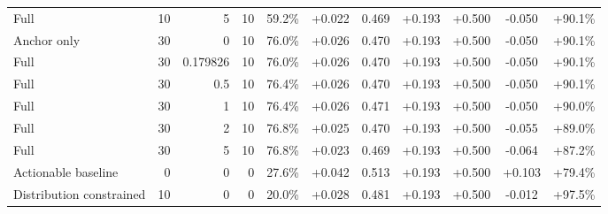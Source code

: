 \begin{table}[htbp]
\begin{tabular}{lrrrccccccc}
Full & 10 & 5 & 10 & 59.2\% & +0.022 & 0.469 & +0.193 & +0.500 & -0.050 & +90.1\% \\
Anchor only & 30 & 0 & 10 & 76.0\% & +0.026 & 0.470 & +0.193 & +0.500 & -0.050 & +90.1\% \\
Full & 30 & 0.179826 & 10 & 76.0\% & +0.026 & 0.470 & +0.193 & +0.500 & -0.050 & +90.1\% \\
Full & 30 & 0.5 & 10 & 76.4\% & +0.026 & 0.470 & +0.193 & +0.500 & -0.050 & +90.1\% \\
Full & 30 & 1 & 10 & 76.4\% & +0.026 & 0.471 & +0.193 & +0.500 & -0.050 & +90.0\% \\
Full & 30 & 2 & 10 & 76.8\% & +0.025 & 0.470 & +0.193 & +0.500 & -0.055 & +89.0\% \\
Full & 30 & 5 & 10 & 76.8\% & +0.023 & 0.469 & +0.193 & +0.500 & -0.064 & +87.2\% \\
Actionable baseline & 0 & 0 & 0 & 27.6\% & +0.042 & 0.513 & +0.193 & +0.500 & +0.103 & +79.4\% \\
Distribution constrained & 10 & 0 & 0 & 20.0\% & +0.028 & 0.481 & +0.193 & +0.500 & -0.012 & +97.5\% \\
\bottomrule
\end{tabular}
\end{table}